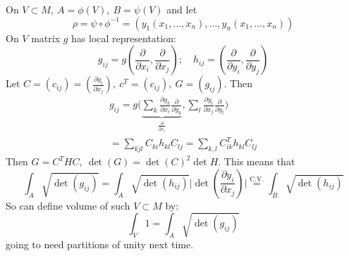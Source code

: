 On $V\subset M, \ A = \phi(V) , \ B=\psi(V)$ and let 
$$\rho = \psi \circ \phi^{-1} = (y_1(x_1,\ldots, x_n) ,\ldots, y_n (x_1,\ldots, x_n))$$
On $V$ matrix $g$ has local representation:
$$g_{ij} = g\left( \frac{\partial}{\partial x_i}, \frac{\partial}{\partial x_j}\right); \quad h_{ij} =\left(  \frac{\partial}{\partial y_i}, \frac{\partial}{\partial y_j}\right)$$
Let $C=(c_{ij}) =  \left( \frac{\partial y_i}{\partial  x_j} \right), \ c^T = (c_{ij}),\ G= (g_{ij})$. Then 
\begin{gather*}
g_{ij} = g\Big(\underbrace{\sum_k \frac{\partial y_k}{\partial x_i }\frac{\partial}{\partial y_k}}_{\frac{\partial}{\partial x_i}}, \sum_l  \frac{\partial y_l}{\partial x_j }\frac{\partial}{\partial y_l}\Big)\\
= \sum_{kjl} C_{ki} h_{kl} C_{lj} = \sum_{k,l} C_{ik}^T h_{kl} C_{lj}
\end{gather*}
Then $G=C^THC,\ \det (G) = \det(C)^2\det H$.
This means that 
$$\int_A \sqrt{\det(g_{ij})} = \int_A\sqrt{\det(h_{ij})} \Big|\det\left( \frac{\partial y_i}{\partial x_j }\right)\Big|\overset{\text{C.V.}}{=}\int_B \sqrt{\det(h_{ij})}$$
So can define volume of such $V\subset M$ by:
$$\int_V 1 = \int_A \sqrt{\det(g_{ij})}$$
going to need partitions of unity next time.

